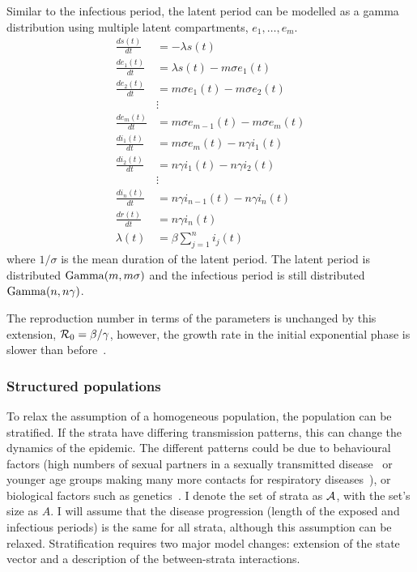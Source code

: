 \documentclass[thesis.tex]{subfiles}
\begin{document}
Similar to the infectious period, the latent period can be modelled as a gamma distribution using multiple latent compartments, $e_1, \dots, e_m$.
\begin{align}
\frac{ds(t)}{dt} &= -\lambda s(t) \\
\frac{de_1(t)}{dt} &= \lambda s(t) - m\sigma e_1(t) \\
\frac{de_2(t)}{dt} &= m\sigma e_1(t) - m \sigma e_2(t) \\
&\vdots \nonumber \\
\frac{de_m(t)}{dt} &= m\sigma e_{m-1}(t) - m \sigma e_m(t) \\
\frac{di_1(t)}{dt} &= m\sigma e_m(t) - n\gamma i_1(t) \\
\frac{di_2(t)}{dt} &= n\gamma i_1(t) - n \gamma i_2(t) \\
&\vdots \nonumber \\
\frac{di_n(t)}{dt} &= n\gamma i_{n-1}(t) - n \gamma i_n(t) \\
\frac{dr(t)}{dt} &= n\gamma i_n(t) \\
\lambda(t) &= \beta \sum_{j=1}^n i_j(t)
\end{align}
where $1/\sigma$ is the mean duration of the latent period.
The latent period is distributed $\operatorname{Gamma}(m, m\sigma)$ and the infectious period is still distributed $\operatorname{Gamma}(n, n\gamma)$.

The reproduction number in terms of the parameters is unchanged by this extension, \ie $\mathcal{R}_{0} = \beta / \gamma$, however, the growth rate in the initial exponential phase is slower than before~\autocite[41]{keelingModeling}.

\subsubsection{Structured populations} \label{SEIR:sec:structured-populations}

To relax the assumption of a homogeneous population, the population can be stratified.
If the strata have differing transmission patterns, this can change the dynamics of the epidemic.
The different patterns could be due to behavioural factors (\eg high numbers of sexual partners in a sexually transmitted disease~\autocite[69]{keelingModeling} or younger age groups making many more contacts for respiratory diseases~\autocite[176]{andersonInfectious}), or biological factors such as genetics~\autocite[208]{andersonInfectious}.
I denote the set of strata as $\mathcal{A}$, with the set's size as $A$.
I will assume that the disease progression (\ie length of the exposed and infectious periods) is the same for all strata, although this assumption can be relaxed.
Stratification requires two major  model changes: extension of the state vector and a description of the between-strata interactions.
\end{document}
